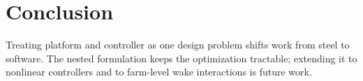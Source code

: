 \chapter{Conclusion}
\label{ch:conclusion}

Treating platform and controller as one design problem shifts work from steel to software. The
nested formulation keeps the optimization tractable; extending it to nonlinear controllers and
to farm-level wake interactions is future work.
